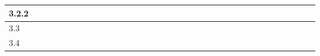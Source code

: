 \begin{table}[]
\begin{tabular}{|l|l|l|l|l|l|l|l|l|l|l|l|l|l|l|l|l|l|l|l|l|l|l|l|l|l|l|l|l|l|l|l|l|l|l|}
    3.2.2 & \cellcolor[HTML]{000000}                        & \cellcolor[HTML]{000000} &                          &                          &                          &                          &                          &                          & \cellcolor[HTML]{000000} &                          &                          & \cellcolor[HTML]{000000} &                          &                          &                          & \cellcolor[HTML]{000000} &                          &                          &                          &                          &                          &                          &                          & \cellcolor[HTML]{343434} &                          &                          & \cellcolor[HTML]{000000} &                          & \cellcolor[HTML]{000000} &                          &                          & \cellcolor[HTML]{000000} & \cellcolor[HTML]{000000} &                          \\ \hline
    3.3   &                                                 &                          &                          &                          &                          &                          &                          &                          &                          &                          &                          &                          &                          &                          &                          &                          &                          &                          &                          &                          &                          &                          &                          &                          &                          &                          &                          &                          & \cellcolor[HTML]{000000} &                          & \cellcolor[HTML]{000000} &                          &                          &                          \\ \hline
    3.4   & \cellcolor[HTML]{000000}                        & \cellcolor[HTML]{000000} & \cellcolor[HTML]{000000} &                          &                          & \cellcolor[HTML]{000000} & \cellcolor[HTML]{000000} &                          &                          & \cellcolor[HTML]{000000} &                          &                          &                          &                          &                          &                          &                          &                          & \cellcolor[HTML]{000000} &                          &                          &                          &                          &                          &                          &                          &                          &                          & \cellcolor[HTML]{000000} &                          &                          &                          &                          &                          \\ \hline
    \end{tabular}
    \end{table}